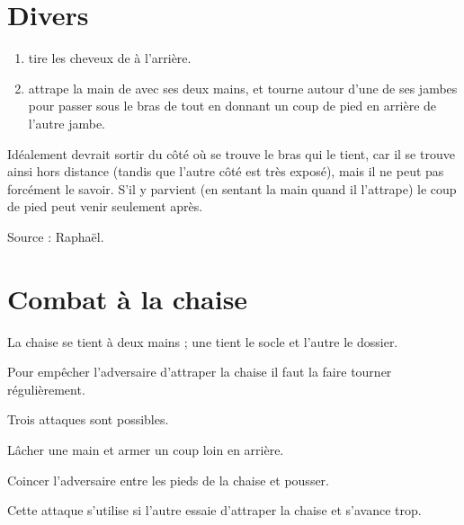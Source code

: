 \section{Divers}


\begin{technique}

\begin{enumerate}
	\item \A tire les cheveux de \D à l'arrière.
	
	\item \D attrape la main de \A avec ses deux mains, et tourne autour d'une de ses jambes pour passer sous le bras de \A tout en donnant un coup de pied en arrière de l'autre jambe.
\end{enumerate}

Idéalement \D devrait sortir du côté où se trouve le bras qui le tient, car il se trouve ainsi hors distance (tandis que l'autre côté est très exposé), mais il ne peut pas forcément le savoir.
S'il y parvient (en sentant la main quand il l'attrape) le coup de pied peut venir seulement après.

Source : Raphaël.
\end{technique}



\section{Combat à la chaise}

La chaise se tient à deux mains ; une tient le socle et l'autre le dossier.

Pour empêcher l'adversaire d'attraper la chaise il faut la faire tourner régulièrement.

Trois attaques sont possibles.

\begin{coup}
\label{coup:close-combat:chaise:frappe-armée}

Lâcher une main et armer un coup loin en arrière.
\end{coup}

\begin{coup}
\label{coup:close-combat:chaise:coincer}

Coincer l'adversaire entre les pieds de la chaise et pousser.

Cette attaque s'utilise si l'autre essaie d'attraper la chaise et s'avance trop.
\end{coup}

